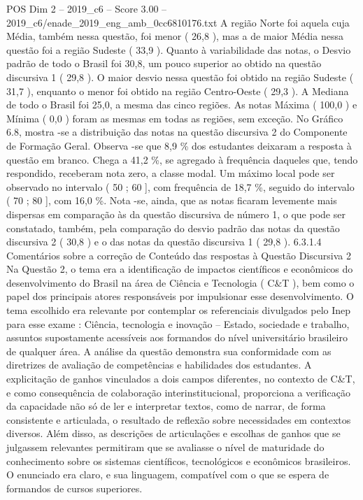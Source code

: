 \begin{textsample}{POS Dim 2 – 2019\_c6 – Score 3.00 – 2019\_c6/enade\_2019\_eng\_amb\_0cc6810176.txt}
A região Norte foi aquela cuja Média, também nessa questão, foi menor ( 26,8 ), mas a de maior Média nessa questão foi a região Sudeste ( 33,9 ).
Quanto à variabilidade das notas, o Desvio padrão de todo o Brasil foi 30,8, um pouco superior ao obtido na questão discursiva 1 ( 29,8 ).
O maior desvio nessa questão foi obtido na região Sudeste ( 31,7 ), enquanto o menor foi obtido na região Centro-Oeste ( 29,3 ).
A Mediana de todo o Brasil foi 25,0, a mesma das cinco regiões.
As notas Máxima ( 100,0 ) e Mínima ( 0,0 ) foram as mesmas em todas as regiões, sem exceção.
No Gráfico 6.8, mostra -se a distribuição das notas na questão discursiva 2 do Componente de Formação Geral.
Observa -se que 8,9 \% dos estudantes deixaram a resposta à questão em branco.
Chega a 41,2 \%, se agregado à frequência daqueles que, tendo respondido, receberam nota zero, a classe modal.
Um máximo local pode ser observado no intervalo ( 50 ; 60 ], com frequência de 18,7 \%, seguido do intervalo ( 70 ; 80 ], com 16,0 \%.
Nota -se, ainda, que as notas ficaram levemente mais dispersas em comparação às da questão discursiva de número 1, o que pode ser constatado, também, pela comparação do desvio padrão das notas da questão discursiva 2 ( 30,8 ) e o das notas da questão discursiva 1 ( 29,8 ). 6.3.1.4 Comentários sobre a correção de Conteúdo das respostas à Questão Discursiva 2 Na Questão 2, o tema era a identificação de impactos científicos e econômicos do desenvolvimento do Brasil na área de Ciência e Tecnologia ( C\&T ), bem como o papel dos principais atores responsáveis por impulsionar esse desenvolvimento.
O tema escolhido era relevante por contemplar os referenciais divulgados pelo Inep para esse exame : Ciência, tecnologia e inovação – Estado, sociedade e trabalho, assuntos supostamente acessíveis aos formandos do nível universitário brasileiro de qualquer área.
A análise da questão demonstra sua conformidade com as diretrizes de avaliação de competências e habilidades dos estudantes.
A explicitação de ganhos vinculados a dois campos diferentes, no contexto de C\&T, e como consequência de colaboração interinstitucional, proporciona a verificação da capacidade não só de ler e interpretar textos, como de narrar, de forma consistente e articulada, o resultado de reflexão sobre necessidades em contextos diversos.
Além disso, as descrições de articulações e escolhas de ganhos que se julgassem relevantes permitiram que se avaliasse o nível de maturidade do conhecimento sobre os sistemas científicos, tecnológicos e econômicos brasileiros.
O enunciado era claro, e sua linguagem, compatível com o que se espera de formandos de cursos superiores.

\end{textsample}
